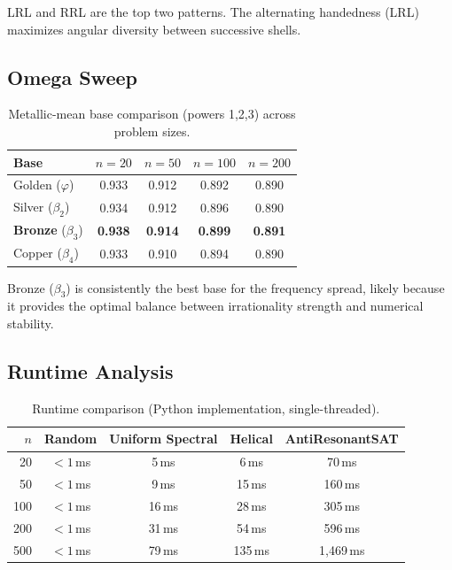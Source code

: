 \documentclass[11pt,a4paper]{article}
\begin{document}
LRL and RRL are the top two patterns. The alternating handedness
(LRL) maximizes angular diversity between successive shells.

\subsection{Omega Sweep}

\begin{table}[h]
\centering
\caption{Metallic-mean base comparison (powers 1,2,3) across problem sizes.}
\label{tab:omega-base}
\begin{tabular}{@{}lcccc@{}}
\toprule
Base & $n=20$ & $n=50$ & $n=100$ & $n=200$ \\
\midrule
Golden ($\varphi$) & 0.933 & 0.912 & 0.892 & 0.890 \\
Silver ($\beta_2$) & 0.934 & 0.912 & 0.896 & 0.890 \\
\textbf{Bronze} ($\beta_3$) & \textbf{0.938} & \textbf{0.914} & \textbf{0.899} & \textbf{0.891} \\
Copper ($\beta_4$) & 0.933 & 0.910 & 0.894 & 0.890 \\
\bottomrule
\end{tabular}
\end{table}

Bronze ($\beta_3$) is consistently the best base for the frequency
spread, likely because it provides the optimal balance between
irrationality strength and numerical stability.

\subsection{Runtime Analysis}

\begin{table}[h]
\centering
\caption{Runtime comparison (Python implementation, single-threaded).}
\label{tab:runtime}
\begin{tabular}{@{}rcccc@{}}
\toprule
$n$ & Random & Uniform Spectral & Helical & AntiResonantSAT \\
\midrule
20  & $<1$\,ms & 5\,ms & 6\,ms & 70\,ms \\
50  & $<1$\,ms & 9\,ms & 15\,ms & 160\,ms \\
100 & $<1$\,ms & 16\,ms & 28\,ms & 305\,ms \\
200 & $<1$\,ms & 31\,ms & 54\,ms & 596\,ms \\
500 & $<1$\,ms & 79\,ms & 135\,ms & 1,469\,ms \\
\bottomrule
\end{tabular}
\end{table}
\end{document}

